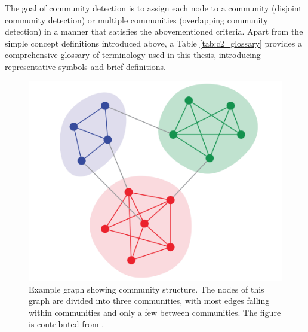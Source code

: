 The goal of community detection is to assign each node to a community (disjoint community detection) or multiple communities (overlapping community detection) in a manner that satisfies the abovementioned criteria. Apart from the simple concept definitions introduced above, a Table \ref{tab:c2_glossary} provides a comprehensive glossary of terminology used in this thesis, introducing representative symbols and brief definitions.
\begin{figure}  
	\centering
	\includegraphics[width=0.5\columnwidth]{img/chapter1/community.png}
	\caption{Example graph showing community structure. The nodes of this graph are divided into three communities, with most edges falling within communities and only a few between communities. The figure is contributed from \cite{newman2012communities}.}
	\label{fig:c1_community}
\end{figure}
 

